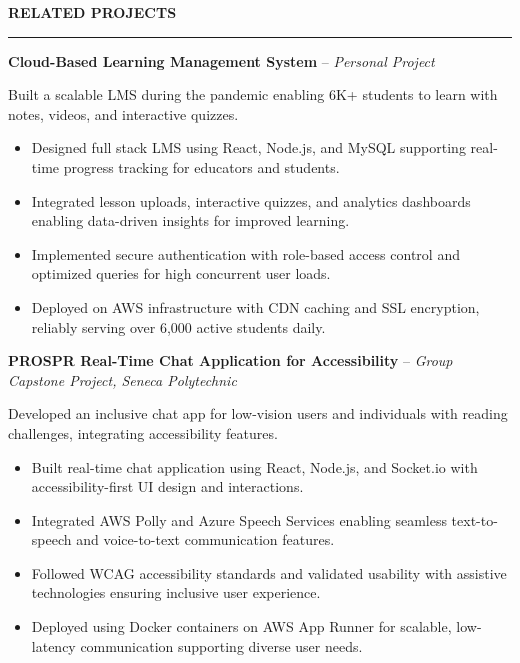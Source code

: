 \documentclass[10pt,letterpaper]{article}
\begin{document}
\vspace{6pt}

\textbf{RELATED PROJECTS}\\[-8pt]
\noindent\rule{\textwidth}{1pt}

\vspace{-2pt}

\textbf{Cloud-Based Learning Management System} -- \emph{Personal Project}

\vspace{-1pt}

Built a scalable LMS during the pandemic enabling 6K+ students to learn with notes, videos, and interactive quizzes.
\vspace{-1pt}
\begin{itemize}
\item Designed full stack LMS using React, Node.js, and MySQL supporting real-time progress tracking for educators and students.
\item Integrated lesson uploads, interactive quizzes, and analytics dashboards enabling data-driven insights for improved learning.
\item Implemented secure authentication with role-based access control and optimized queries for high concurrent user loads.
\item Deployed on AWS infrastructure with CDN caching and SSL encryption, reliably serving over 6,000 active students daily.
\end{itemize}

\textbf{PROSPR  Real-Time Chat Application for Accessibility} -- \emph{Group Capstone Project, Seneca Polytechnic}

\vspace{-1pt}

Developed an inclusive chat app for low-vision users and individuals with reading challenges, integrating accessibility features.
\vspace{-1pt}
\begin{itemize}
\item Built real-time chat application using React, Node.js, and Socket.io with accessibility-first UI design and interactions.
\item Integrated AWS Polly and Azure Speech Services enabling seamless text-to-speech and voice-to-text communication features.
\item Followed WCAG accessibility standards and validated usability with assistive technologies ensuring inclusive user experience.
\item Deployed using Docker containers on AWS App Runner for scalable, low-latency communication supporting diverse user needs.
\end{itemize}
\end{document}
